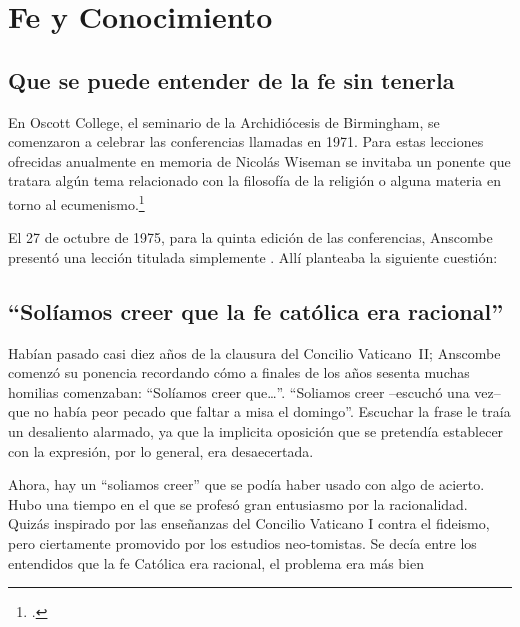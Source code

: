 \section{Fe y Conocimiento}

\subsection{Que se puede entender de la fe sin tenerla}  
En Oscott College, el seminario de la Archidiócesis de Birmingham, se
  comenzaron a celebrar las conferencias llamadas 
  en 1971. Para estas lecciones ofrecidas anualmente en memoria de Nicolás
  Wiseman se invitaba un ponente que tratara algún tema relacionado con la
  filosofía de la religión o alguna materia en torno al
  ecumenismo.\footcite[cf.~][p.~7]{wisemanlects}

  El 27 de octubre de 1975, para la quinta edición de las conferencias, Anscombe
  presentó una lección titulada simplemente . Allí planteaba la
  siguiente cuestión:



\subsection{``Solíamos creer que la fe católica era racional''} Habían pasado
casi diez años de la clausura del Concilio \mbox{Vaticano II}; Anscombe comenzó
su ponencia recordando cómo a finales de los años sesenta muchas homilias
comenzaban: ``Solíamos creer que\ldots''. ``Soliamos creer --escuchó una vez--
que no había peor pecado que faltar a misa el domingo''. Escuchar la frase le
traía un desaliento alarmado, ya que la implicita oposición que se pretendía
establecer con la expresión, por lo general, era desaecertada.

Ahora, hay un ``soliamos creer'' que se podía haber usado con algo de acierto.
Hubo una tiempo en el que se profesó gran entusiasmo por la racionalidad. Quizás
inspirado por las enseñanzas del Concilio Vaticano I contra el fideismo, pero
ciertamente promovido por los estudios neo-tomistas. Se decía entre los
entendidos que la fe Católica era racional, el problema era más bien

